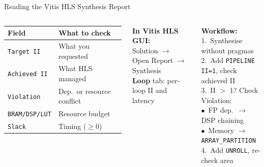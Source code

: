 \documentclass[aspectratio=169,12pt]{beamer}
\begin{document}
\begin{frame}{Reading the Vitis HLS Synthesis Report}
\vspace{0.15cm}
\begin{columns}[T,totalwidth=\textwidth]

  \begin{tabular}{p{2.5cm}p{4.2cm}}
    \hline
    \rowcolor{Navy!10}\textbf{Field} & \textbf{What to check}\\
    \hline
    \texttt{Target II}     & What you requested\\
    \hline
    \rowcolor{Navy!5}\texttt{Achieved II}  & What HLS managed\\
    \hline
    \texttt{Violation}     & Dep.\ or resource conflict\\
    \hline
    \rowcolor{Navy!5}\texttt{BRAM/DSP/LUT} & Resource budget\\
    \hline
    \texttt{Slack}         & Timing ($\geq 0$)\\
    \hline
  \end{tabular}

  \vspace{10pt}
  \colorbox{Teal!10}{\parbox{\dimexpr\linewidth-2\fboxsep\relax}{\vspace{4pt}
    {\color{Teal}\bfseries In Vitis HLS GUI:}\\
    {\small Solution $\to$ Open Report $\to$ Synthesis\\
    \textbf{Loop} tab: per-loop II and latency}
  \vspace{4pt}}}

  \vspace{0.1cm}
  \colorbox{Orange!10}{\parbox{\dimexpr\linewidth-2\fboxsep\relax}{\vspace{4pt}
    {\color{Orange}\bfseries Workflow:}\\[4pt]
    {\small
    1.\ Synthesise without pragmas\\[2pt]
    2.\ Add \texttt{PIPELINE II=1}, check achieved II\\[2pt]
    3.\ II $>$ 1? Check Violation:\\
    \hspace{8pt}$\bullet$\ FP dep.\ $\to$ DSP chaining\\
    \hspace{8pt}$\bullet$\ Memory $\to$ \texttt{ARRAY\_PARTITION}\\[2pt]
    4.\ Add \texttt{UNROLL}, re-check area}
  \vspace{4pt}}}
\end{columns}
\end{frame}
\end{document}
